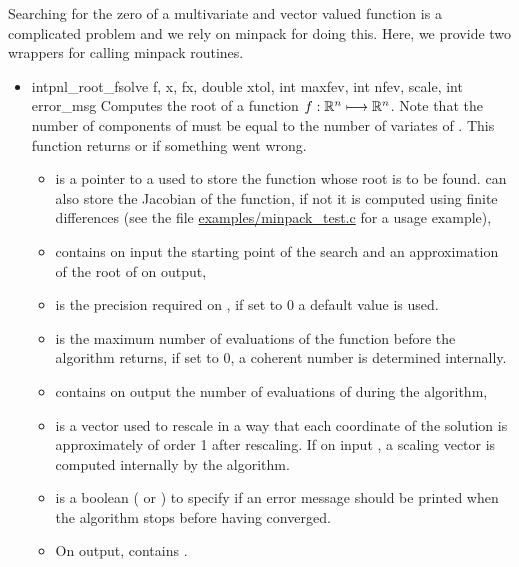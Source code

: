 Searching for the zero of a multivariate and vector valued function is a
complicated problem and we rely on minpack for doing this. Here, we provide
two wrappers for calling minpack routines.
\begin{itemize}
\item \describefun
  {int}{pnl_root_fsolve}{ \ptr f,
     \ptr x,  \ptr fx, double xtol,
    int maxfev, int \ptr nfev,  \ptr scale, int
    error_msg}
  \sshortdescribe Computes the root of a function $f:{\mathbb R}^n \longmapsto
  {\mathbb R}^n$. Note that the number of components of  must be equal to the
  number of variates of . This function returns  or
   if something went wrong.
  \parameters
  \begin{itemize}
  \item {} is a pointer to a  used to
    store the function whose root is to be found.  can also
    store the Jacobian of the function, if not it is computed using
    finite differences (see the file \url{examples/minpack_test.c} for
    a usage example),
  \item  {} contains on input the starting point of the search and
    an approximation of the root of  on output,
  \item {} is the precision required on , if set to 0 a
    default value is used.
  \item {} is the maximum number of evaluations of the function
     before the algorithm returns, if set to 0, a coherent
    number is determined internally.
  \item {} contains on output the number of evaluations of
     during the algorithm,
  \item {} is a vector used to rescale  in a way that
    each coordinate of the solution is approximately of order 1 after
    rescaling. If on input , a scaling vector is
    computed internally by the algorithm.
  \item {} is a boolean
    ( or ) to specify if an error message should be
    printed when the algorithm stops before having converged.
  \item On output,  contains .
  \end{itemize}


\end{itemize}
